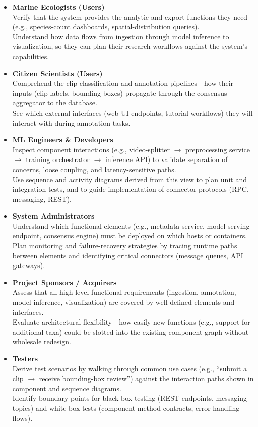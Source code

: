 \begin{itemize}
    \item \textbf{Marine Ecologists (Users)}\\
    Verify that the system provides the analytic and export functions they need (e.g., species-count dashboards, spatial-distribution queries).\\
    Understand how data flows from ingestion through model inference to visualization, so they can plan their research workflows against the system’s capabilities.

    \item \textbf{Citizen Scientists (Users)}\\
    Comprehend the clip-classification and annotation pipelines—how their inputs (clip labels, bounding boxes) propagate through the consensus aggregator to the database.\\
    See which external interfaces (web-UI endpoints, tutorial workflows) they will interact with during annotation tasks.

    \item \textbf{ML Engineers \& Developers}\\
    Inspect component interactions (e.g., video-splitter $\rightarrow$ preprocessing service $\rightarrow$ training orchestrator $\rightarrow$ inference API) to validate separation of concerns, loose coupling, and latency-sensitive paths.\\
    Use sequence and activity diagrams derived from this view to plan unit and integration tests, and to guide implementation of connector protocols (RPC, messaging, REST).

    \item \textbf{System Administrators}\\
    Understand which functional elements (e.g., metadata service, model-serving endpoint, consensus engine) must be deployed on which hosts or containers.\\
    Plan monitoring and failure-recovery strategies by tracing runtime paths between elements and identifying critical connectors (message queues, API gateways).

    \item \textbf{Project Sponsors / Acquirers}\\
    Assess that all high-level functional requirements (ingestion, annotation, model inference, visualization) are covered by well-defined elements and interfaces.\\
    Evaluate architectural flexibility—how easily new functions (e.g., support for additional taxa) could be slotted into the existing component graph without wholesale redesign.

    \item \textbf{Testers}\\
    Derive test scenarios by walking through common use cases (e.g., ``submit a clip $\rightarrow$ receive bounding-box review'') against the interaction paths shown in component and sequence diagrams.\\
    Identify boundary points for black-box testing (REST endpoints, messaging topics) and white-box tests (component method contracts, error-handling flows).
\end{itemize}

